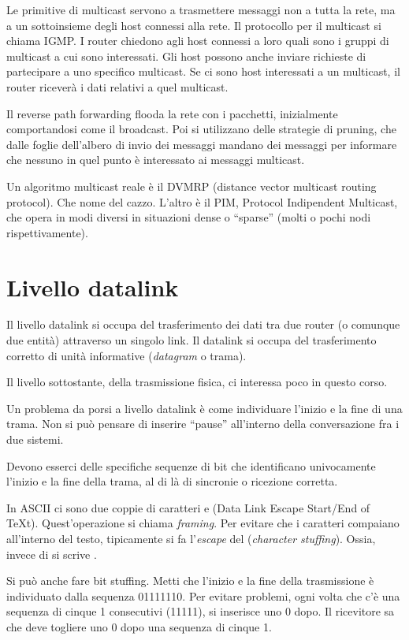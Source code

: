 Le primitive di multicast servono a trasmettere messaggi non a tutta la rete, ma a un sottoinsieme degli host connessi alla rete. Il protocollo per il multicast si chiama IGMP. I router chiedono agli host connessi a loro quali sono i gruppi di multicast a cui sono interessati. Gli host possono anche inviare richieste di partecipare a uno specifico multicast. Se ci sono host interessati a un multicast, il router ricever\`a i dati relativi a quel multicast.

Il reverse path forwarding flooda la rete con i pacchetti, inizialmente comportandosi come il broadcast. Poi si utilizzano delle strategie di pruning, che dalle foglie dell'albero di invio dei messaggi mandano dei messaggi per informare che nessuno in quel punto \`e interessato ai messaggi multicast.

Un algoritmo multicast reale \`e il DVMRP (distance vector multicast routing protocol). Che nome del cazzo. L'altro \`e il PIM, Protocol Indipendent Multicast, che opera in modi diversi in situazioni dense o ``sparse'' (molti o pochi nodi rispettivamente).

\section{Livello datalink}

Il livello datalink si occupa del trasferimento dei dati tra due router (o comunque due entit\`a) attraverso un singolo link. Il datalink si occupa del trasferimento corretto di unit\`a informative (\emph{datagram} o trama).

Il livello sottostante, della trasmissione fisica, ci interessa poco in questo corso.

Un problema da porsi a livello datalink \`e come individuare l'inizio e la fine di una trama. Non si pu\`o pensare di inserire ``pause'' all'interno della conversazione fra i due sistemi.

Devono esserci delle specifiche sequenze di bit che identificano univocamente l'inizio e la fine della trama, al di l\`a di sincronie o ricezione corretta.

In ASCII ci sono due coppie di caratteri  e  (Data Link Escape Start/End of TeXt). Quest'operazione si chiama \emph{framing}. Per evitare che i caratteri compaiano all'interno del testo, tipicamente si fa l'\emph{escape} del  (\emph{character stuffing}). Ossia, invece di  si scrive .

Si pu\`o anche fare bit stuffing. Metti che l'inizio e la fine della trasmissione \`e individuato dalla sequenza 01111110. Per evitare problemi, ogni volta che c'\`e una sequenza di cinque 1 consecutivi (11111), si inserisce uno 0 dopo. Il ricevitore sa che deve togliere uno 0 dopo una sequenza di cinque 1.

